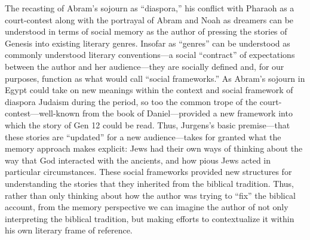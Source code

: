 The recasting of Abram's sojourn as ``diaspora,'' his conflict with Pharaoh as a court-contest along with the portrayal of Abram and Noah as dreamers can be understood in terms of social memory as the author of \ga pressing the stories of Genesis into existing literary genres. Insofar as ``genres'' can be understood as commonly understood literary conventions---a social ``contract'' of expectations between the author and her audience---they are socially defined and, for our purposes, function as what \halbwachs would call ``social frameworks.'' As Abram's sojourn in Egypt could take on new meanings within the context and social framework of diaspora Judaism during the \secondtemple period, so too the common trope of the court-contest---well-known from the book of Daniel---provided a new framework into which the story of Gen 12 could be read. Thus, Jurgens's basic premise---that these stories are ``updated'' for a new audience---takes for granted what the memory approach makes explicit: \secondtemple Jews had their own ways of thinking about the way that God interacted with the ancients, and how pious Jews acted in particular circumstances. These social frameworks provided new structures for understanding the stories that they inherited from the biblical tradition. Thus, rather than only thinking about how the author was trying to ``fix'' the biblical account, from the memory perspective we can imagine the author of \ga not only interpreting the biblical tradition, but making efforts to contextualize it within his own literary frame of reference.